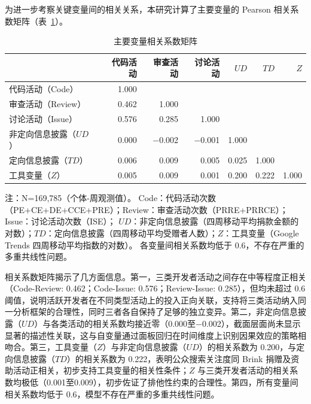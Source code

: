 \documentclass[
    type = master, %
    degree = professional,        %
    decl-page,  %
    twoside,                %
    fontset = fandol %
  ]{njuthesis}
\begin{document}
为进一步考察关键变量间的相关关系，本研究计算了主要变量的 Pearson 相关系数矩阵（表~\ref{tab:correlation}）。

\begin{table}[htbp]
    \centering
    \caption{主要变量相关系数矩阵}
    \label{tab:correlation}
    \small
    \begin{tabularx}{\textwidth}{Xrrrrrr}
        \toprule
        & 代码活动 & 审查活动 & 讨论活动 & $UD$ & $TD$ & $Z$ \\
        \midrule
        代码活动（Code）     & 1.000 & & & & & \\
        审查活动（Review）   & 0.462 & 1.000 & & & & \\
        讨论活动（Issue）    & 0.576 & 0.285 & 1.000 & & & \\
        非定向信息披露（$UD$）  & 0.000 & $-$0.002 & $-$0.001 & 1.000 & & \\
        定向信息披露（$TD$）    & 0.006 & 0.009 & 0.005 & 0.025 & 1.000 & \\
        工具变量（$Z$）        & 0.005 & 0.009 & 0.001 & 0.200 & 0.222 & 1.000 \\
        \bottomrule
    \end{tabularx}
    \begin{minipage}{\textwidth}
        \vspace{0.3em}
        \footnotesize 注：N=169,785（个体-周观测值）。
        Code：代码活动次数（PE+CE+DE+CCE+PRE）；Review：审查活动次数（PRRE+PRRCE）；Issue：讨论活动次数（ISE）；
        $UD$：非定向信息披露（四周移动平均捐款金额的对数）；$TD$：定向信息披露（四周移动平均受赠者人数）；$Z$：工具变量（Google Trends 四周移动平均指数的对数）。
        各变量间相关系数均低于 0.6，不存在严重的多重共线性问题。
    \end{minipage}
\end{table}

相关系数矩阵揭示了几方面信息。第一，三类开发者活动之间存在中等程度正相关（Code-Review: 0.462；Code-Issue: 0.576；Review-Issue: 0.285），但均未超过 0.6 阈值，说明活跃开发者在不同类型活动上的投入正向关联，支持将三类活动纳入同一分析框架的合理性，同时三者各自保持了足够的独立变异。第二，非定向信息披露（$UD$）与各类活动的相关系数均接近零（0.000至$-$0.002），截面层面尚未显示显著的描述性关联，这与自变量通过面板回归在时间维度上识别因果效应的策略相吻合。第三，工具变量（$Z$）与非定向信息披露（$UD$）的相关系数为 0.200，与定向信息披露（$TD$）的相关系数为 0.222，表明公众搜索关注度同 Brink 捐赠及资助活动正相关，初步支持工具变量的相关性条件；$Z$ 与三类开发者活动的相关系数均极低（0.001至0.009），初步佐证了排他性约束的合理性。第四，所有变量间相关系数均低于 0.6，模型不存在严重的多重共线性问题。
\end{document}
